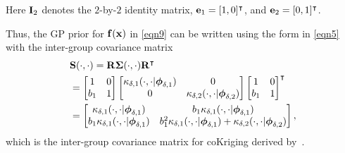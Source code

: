\documentclass[iicol,sn-basic]{sn-jnl}%
\begin{document}
Here ${\bf I}_2$ denotes the $2$-by-$2$ identity matrix, ${\bf e}_1 = [1,0]^\intercal$, and ${\bf e}_2 = [0,1]^\intercal$. 

Thus, the GP prior for ${\bf f}({\bf x})$ in \cref{eqn9} can be written using the form in \cref{eqn5} with the inter-group covariance matrix
\begin{equation}\label{eqn11}
	\begin{aligned}
		& {\bf S}(\cdot,\cdot)  = {\bf R} {\boldsymbol \Sigma}(\cdot,\cdot) {\bf R}^\intercal \\
		 & = \left[\begin{matrix}
		 	1 & 0 \\
		 	b_1 & 1
		 \end{matrix}\right] 
		 \left[\begin{matrix}
		 	\kappa_{\delta,1}(\cdot,\cdot|{\boldsymbol \phi}_{\delta,1}) & 0 \\
		 	0 & \kappa_{\delta,2}(\cdot,\cdot|{\boldsymbol \phi}_{\delta,2})
		 \end{matrix}\right]
		 \left[\begin{matrix}
		 	1 & 0 \\
		 	b_1 & 1
		 \end{matrix}\right]^\intercal \\
	 & = \left[\begin{matrix}
	 	\kappa_{\delta,1}(\cdot,\cdot|{\boldsymbol \phi}_{\delta,1}) & b_1 \kappa_{\delta,1}(\cdot,\cdot|{\boldsymbol \phi}_{\delta,1}) \\
	 	b_1 \kappa_{\delta,1}(\cdot,\cdot|{\boldsymbol \phi}_{\delta,1}) & b_1^2 \kappa_{\delta,1}(\cdot,\cdot|{\boldsymbol \phi}_{\delta,1})+\kappa_{\delta,2}(\cdot,\cdot|{\boldsymbol \phi}_{\delta,2})
	 \end{matrix}\right], 
	\end{aligned}
\end{equation}
which is the inter-group covariance matrix for coKriging derived by~\cite{Forrester2007}.
\end{document}
